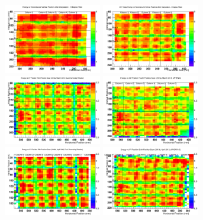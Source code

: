 \documentclass[hidelinks,11pt]{article}
\numberwithin{figure}{section}
\numberwithin{table}{section}
\begin{document}
\begin{figure}[hbtp]
\begin{center}
\includegraphics[width=0.38\textwidth]{Plots/InterFitsWithLine/Inter20172ndScan.png}
\includegraphics[width=0.38\textwidth]{Plots/InterFitsWithLine/Inter20173rdScan.png}
\includegraphics[width=0.38\textwidth]{Plots/2018NoInterFits/EnPo20183rdScan.png}
\includegraphics[width=0.38\textwidth]{Plots/2018NoInterFits/EnPo20184thScan.png}
\includegraphics[width=0.38\textwidth]{Plots/2018NoInterFits/EnPo20185thScan.png}
\includegraphics[width=0.38\textwidth]{Plots/2018NoInterFits/EnPo20186thScan.png}

\end{center}
\end{figure}
\end{document}
